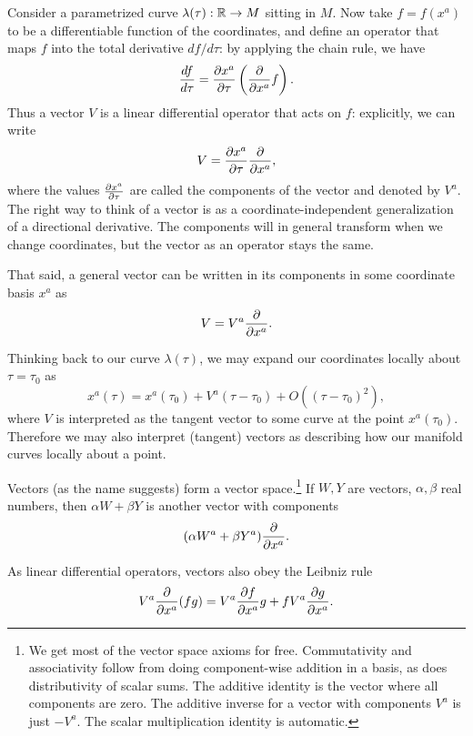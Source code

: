 Consider a parametrized curve $\lambda(\tau):\RR\to M$ sitting in $M$. Now take $f=f(x^a)$ to be a differentiable function of the coordinates, and define an operator that maps $f$ into the total derivative $df/d\tau$: by applying the chain rule, we have
$$\frac{df}{d\tau}=\P{x^a}{\tau}\left(\P{}{x^a}f\right).$$
Thus a vector $V$ is a linear differential operator that acts on $f$: explicitly, we can write $$V=\P{x^a}{\tau}\P{}{x^a},$$ where the values $\P{x^a}{\tau}$ are called the components of the vector and denoted by $V^a$. The right way to think of a vector is as a coordinate-independent generalization of a directional derivative. The components will in general transform when we change coordinates, but the vector as an operator stays the same.

That said, a general vector can be written in its components in some coordinate basis $x^a$ as
$$V= V^a \P{}{x^a}.$$

Thinking back to our curve $\lambda(\tau)$, we may expand our coordinates locally about $\tau=\tau_0$ as 
\begin{equation}x^a(\tau)=x^a (\tau_0)+V^a (\tau-\tau_0)+O((\tau-\tau_0)^2),
\end{equation}
where $V$ is interpreted as the tangent vector to some curve at the point $x^a(\tau_0)$. %
Therefore we may also interpret (tangent) vectors as describing how our manifold curves locally about a point.

Vectors (as the name suggests) form a vector space.\footnote{We get most of the vector space axioms for free. Commutativity and associativity follow from doing component-wise addition in a basis, as does distributivity of scalar sums. The additive identity is the vector where all components are zero. The additive inverse for a vector with components $V^a$ is just $-V^a$. The scalar multiplication identity is automatic.} 
If $W, Y$ are vectors, $\alpha,\beta$ real numbers, then $\alpha W + \beta Y$ is another vector with components
$$(\alpha W^a+\beta Y^a)\P{}{x^a}.$$

As linear differential operators, vectors also obey the Leibniz rule
$$V^a \P{}{x^a}(fg)= V^a \P{f}{x^a} g+ f V^a \P{g}{x^a}.$$

